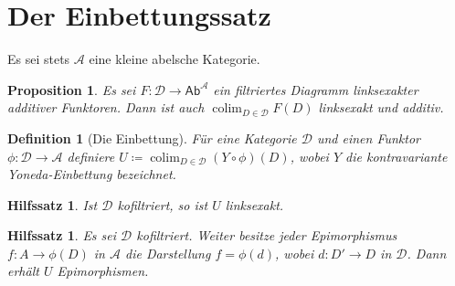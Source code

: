 \documentclass[a4paper, parskip=half]{scrartcl}
\theoremstyle{marginbreak}
\newtheorem{proposition}[remark]{Proposition}
\newtheorem{lemma}[remark]{Hilfssatz}
\newtheorem{definition}[remark]{Definition}
\theoremstyle{nonumberplain}
\newtheorem{proof}{Beweis.}
\newcommand\ccat\mathsf
\newcommand\cat\mathcal
\newcommand{\p}[1]{\iftoggle{proofs}{#1}{}}
\DeclareMathOperator{\colim}{colim}
\begin{document}
	\section{Der Einbettungssatz}
		Es sei stets $\cat{A}$ eine kleine abelsche Kategorie.
		\begin{proposition}\label{1-14-1}
			Es sei $F\colon\cat{D}\to\ccat{Ab}^{\cat{A}}$ ein filtriertes Diagramm
			linksexakter additiver Funktoren. Dann ist auch $\colim_{D\in\cat{D}} F(D)$
			linksexakt und additiv.
		\end{proposition}
		\p{\begin{proof}
			Ohne.
		\end{proof}}
		\begin{definition}[Die Einbettung]
			Für eine Kategorie $\cat{D}$ und einen Funktor $\phi\colon\cat{D}\to\cat{A}$
			definiere $U\coloneqq\colim_{D\in\cat{D}} (Y\circ\phi)(D)$, wobei $Y$ die
			kontravariante Yoneda-Einbettung bezeichnet.
		\end{definition}
		\begin{lemma}
			Ist $\cat{D}$ kofiltriert, so ist $U$ linksexakt.
		\end{lemma}
		\p{\begin{proof}
			Jeder darstellbare Funktor $\cat{A}(A, {-})\colon\cat{A}\to\ccat{Ab}$
			präserviert Limiten, denn der darstellbare Funktor
			$\cat{A}(A, {-})\colon\cat{A}\to\ccat{Set}$ tut das (Vortrag),
			und der Vergissfunktor $\ccat{Ab}\to\ccat{Set}$ reflektiert Limiten
			(Ohne Beweis? Liegt daran dass er Isomorphismen reflektiert). Also
			ist $\cat{A}(A, {-})\colon \cat{A}\to\ccat{Ab}$ linksexakt (Vortrag).
			Da $Y$ kontravariant ist, ist $U$ ein filtrierter Colimes linksexakter
			Funktoren und mit \ref{1-14-1} selbst linksexakt.
		\end{proof}}
		\begin{lemma}
			Es sei $\cat{D}$ kofiltriert. Weiter besitze jeder Epimorphismus
			$f\colon A\to\phi(D)$ in $\cat{A}$ die Darstellung $f = \phi(d)$, wobei
			$d\colon D'\to D$ in $\cat{D}$. Dann erhält $U$ Epimorphismen.
		\end{lemma}
\end{document}
